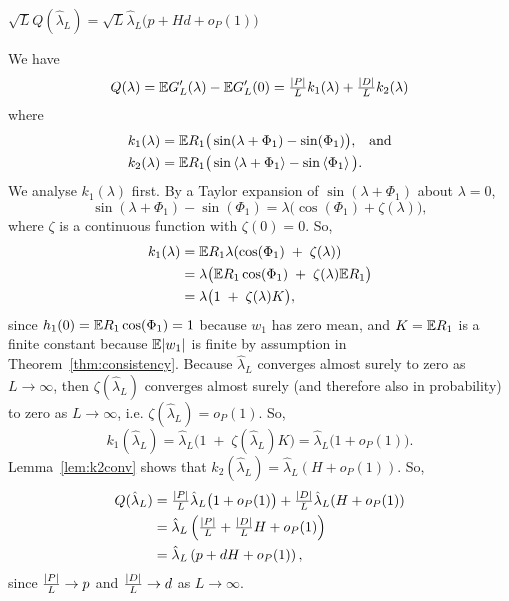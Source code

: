 \documentclass[journal]{IEEEtran}
\begin{document}
\begin{lemma}\label{lem:Qconv}
$\sqrt{L} Q(\hat{\lambda}_L) = \sqrt{L} \hat{\lambda}_L\big( p + Hd  + o_P(1) \big)$
\end{lemma}
\begin{IEEEproof}
We have
\[
Q(\lambda) = {\mathbb E} G_L^\prime(\lambda) - {\mathbb E} G_L^\prime(0) = \tfrac{{\left\vert P \right\vert}}{L} k_1(\lambda) + \tfrac{{\left\vert D \right\vert}}{L} k_2(\lambda)
\]
where
\begin{align}
k_1(\lambda) &= {\mathbb E} R_1\big( \sin(\lambda + \Phi_1) - \sin(\Phi_1) \big), \;\;\; \text{and} \nonumber\\
k_2(\lambda) &= {\mathbb E} R_1\big( \sin\left\langle \lambda + \Phi_1 \right\rangle - \sin\left\langle \Phi_1 \right\rangle \big). \label{eq:k2def}
\end{align}
We analyse $k_1(\lambda)$ first.  By a Taylor expansion of $\sin(\lambda + \Phi_1)$ about $\lambda = 0$,
\[
\sin(\lambda + \Phi_1) - \sin(\Phi_1) = \lambda \big( \cos(\Phi_1) + \zeta(\lambda) \big),
\]
where $\zeta$ is a continuous function with $\zeta(0) = 0$.  So,
\begin{align*}
k_1(\lambda) &= {\mathbb E} R_1\lambda(\cos(\Phi_1) \; + \; \zeta(\lambda)) \\
&= \lambda \big( {\mathbb E} R_1\cos(\Phi_1) \; + \; \zeta(\lambda) {\mathbb E} R_1 \big) \\
&= \lambda \big( 1 \; + \; \zeta(\lambda) K \big),
\end{align*}
since $h_1(0) = {\mathbb E} R_1\cos(\Phi_1) = 1$ because $w_1$ has zero mean, and $K = {\mathbb E} R_1$ is a finite constant because ${\mathbb E}{\left\vert w_1 \right\vert}$ is finite by assumption in Theorem~\ref{thm:consistency}.  Because $\hat{\lambda}_L$ converges almost surely to zero as $L \rightarrow\infty$, then $\zeta(\hat{\lambda}_L)$ converges almost surely (and therefore also in probability) to zero as $L \rightarrow\infty$, i.e. $\zeta(\hat{\lambda}_L) = o_P(1)$.  So, 
\[
k_1(\hat{\lambda}_L) = \hat{\lambda}_L \big( 1 \; + \; \zeta(\hat{\lambda}_L) K \big) = \hat{\lambda}_L \big( 1  + o_P(1)\big).
\]
Lemma~\ref{lem:k2conv} shows that $k_2(\hat{\lambda}_L) = \hat{\lambda}_L ( H + o_P(1) )$.  So,
\begin{align*}
Q(\hat{\lambda}_L) &=  \tfrac{{\left\vert P \right\vert}}{L} \hat{\lambda}_L \big( 1  + o_P(1)\big)  + \tfrac{{\left\vert D \right\vert}}{L} \hat{\lambda}_L ( H + o_P(1) ) \\
&= \hat{\lambda}_L \left( \tfrac{{\left\vert P \right\vert}}{L}  + \tfrac{{\left\vert D \right\vert}}{L} H + o_P(1) \right) \\
&= \hat{\lambda}_L \left( p  + d H + o_P(1) \right),
\end{align*}
since $\frac{{\left\vert P \right\vert}}{L} \rightarrow p$ and $\frac{{\left\vert D \right\vert}}{L} \rightarrow d$ as $L \rightarrow \infty$.
\end{IEEEproof}
\end{document}

